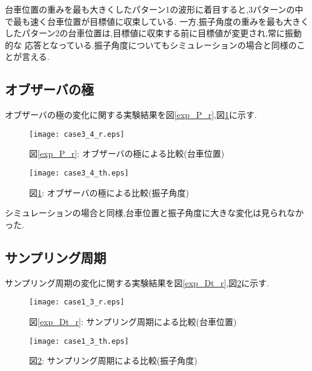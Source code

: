 台車位置の重みを最も大きくしたパターン1の波形に着目すると,3パターンの中で最も速く台車位置が目標値に収束している.
一方,振子角度の重みを最も大きくしたパターン2の台車位置は,目標値に収束する前に目標値が変更され,常に振動的な
応答となっている.振子角度についてもシミュレーションの場合と同様のことが言える.


\subsection{オブザーバの極}
オブザーバの極の変化に関する実験結果を図\ref{exp_P_r},図\ref{exp_P_th}に示す.

\begin{figure}[htbp]
    \begin{minipage}{0.5\hsize}
        \begin{center}
            \texttt{[image: case3\_4\_r.eps]}
            \caption{図\ref{exp_P_r}: オブザーバの極による比較(台車位置)}
            \label{exp_P_r}
        \end{center}
    \end{minipage}
    \begin{minipage}{0.5\hsize}
        \begin{center}
            \texttt{[image: case3\_4\_th.eps]}
            \caption{図\ref{exp_P_th}: オブザーバの極による比較(振子角度)}
            \label{exp_P_th}
        \end{center}
    \end{minipage}
\end{figure}

シミュレーションの場合と同様,台車位置と振子角度に大きな変化は見られなかった.


\subsection{サンプリング周期}
サンプリング周期の変化に関する実験結果を図\ref{exp_Dt_r},図\ref{exp_Dt_th}に示す.

\begin{figure}[htbp]
    \begin{minipage}{0.5\hsize}
        \begin{center}
            \texttt{[image: case1\_3\_r.eps]}
            \caption{図\ref{exp_Dt_r}: サンプリング周期による比較(台車位置)}
            \label{exp_Dt_r}
        \end{center}
    \end{minipage}
    \begin{minipage}{0.5\hsize}
        \begin{center}
            \texttt{[image: case1\_3\_th.eps]}
            \caption{図\ref{exp_Dt_th}: サンプリング周期による比較(振子角度)}
            \label{exp_Dt_th}
        \end{center}
    \end{minipage}
\end{figure}

